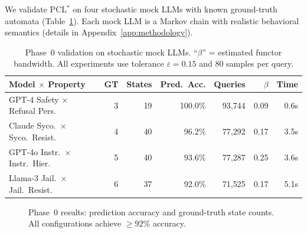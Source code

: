 \documentclass[11pt]{article}
\newcommand{\pclstar}{PCL$^*$}
\begin{document}
We validate \pclstar{} on four stochastic mock LLMs with known
ground-truth automata (Table~\ref{tab:phase0}).  Each mock LLM is a
Markov chain with realistic behavioral semantics (details in
Appendix~\ref{app:methodology}).

\begin{table}[t]
\centering
\caption{Phase~0 validation on stochastic mock LLMs.  ``$\beta$'' =
  estimated functor bandwidth.  All experiments use tolerance
  $\varepsilon = 0.15$ and 80 samples per query.}
\label{tab:phase0}
\small
\begin{tabular}{@{}lrrrrrr@{}}
\toprule
\textbf{Model $\times$ Property} & GT & States & Pred.\ Acc. & Queries & $\beta$ & Time \\
\midrule
GPT-4 Safety $\times$ Refusal Pers. & 3 & 19 & 100.0\% & 93{,}744 & 0.09 & 0.6s \\
Claude Syco.\ $\times$ Syco.\ Resist. & 4 & 40 & 96.2\% & 77{,}292 & 0.17 & 3.5s \\
GPT-4o Instr.\ $\times$ Instr.\ Hier. & 5 & 40 & 93.6\% & 77{,}287 & 0.25 & 3.6s \\
Llama-3 Jail.\ $\times$ Jail.\ Resist. & 6 & 37 & 92.0\% & 71{,}525 & 0.17 & 5.1s \\
\bottomrule
\end{tabular}
\end{table}

\begin{figure}[t]
\centering
{}
\caption{Phase~0 results: prediction accuracy and ground-truth state
  counts.  All configurations achieve ${\ge}92\%$ accuracy.}
\label{fig:phase0}
\end{figure}
\end{document}
